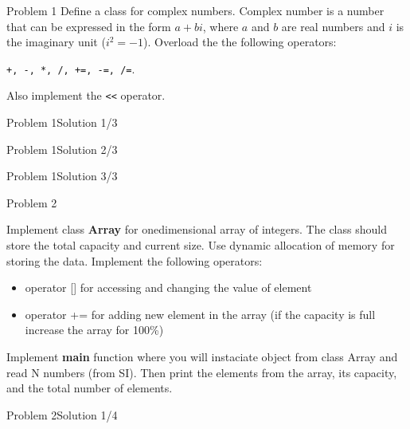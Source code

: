 
\begin{frame}{Problem 1}
Define a class for complex numbers. Complex number is a number that can be
expressed in the form $a + bi$, where $a$ and $b$ are real numbers and $i$ is
the imaginary unit ($i^2 = -1$). Overload the the following operators:

 \texttt{+, -, *, /, +=, -=, /=}.
 
 Also implement the \texttt{<<} operator.
\end{frame}

\begin{frame}[fragile]{Problem 1}{Solution 1/3}

\end{frame}

\begin{frame}[fragile]{Problem 1}{Solution 2/3}

\end{frame}

\begin{frame}[fragile]{Problem 1}{Solution 3/3}

\end{frame}

\begin{frame}{Problem 2}
\begin{scriptsize}
Implement class \textbf{Array} for onedimensional array of integers. The class
should store the total capacity and current size. Use dynamic allocation of
memory for storing the data. Implement the following operators:
\begin{itemize}
  \item operator [] for accessing and changing the value of element
  \item operator += for adding new element in the array (if the capacity is
  full increase the array for 100\%)
\end{itemize}

Implement \textbf{main} function where you will instaciate object from class
Array and read N numbers (from SI). Then print the elements from the array, its
capacity, and the total number of elements.

\end{scriptsize}
\end{frame}

\begin{frame}[fragile]{Problem 2}{Solution 1/4}

\end{frame}

